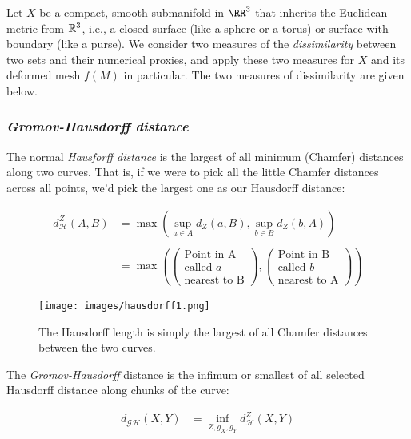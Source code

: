 Let $X$ be a compact, smooth submanifold in $\RR^3$ 
that inherits the Euclidean metric from $\mathbb{R}^3$, i.e., a closed
surface (like a sphere or a torus) or surface with boundary (like 
a purse). We consider two measures of the \emph{dissimilarity} between 
two sets and their numerical proxies, and apply these two 
measures for $X$ and its deformed mesh $f(M)$ in particular. The 
two measures of dissimilarity are given below.

\subsubsection{\emph{Gromov-Hausdorff distance}}

The normal \emph{Hausforff distance} is the largest of
all minimum (Chamfer) distances along two curves.
That is, if we were to pick all the little Chamfer
distances across all points, we'd pick the largest one
as our Hausdorff distance:

\begin{align*}
    d_{\mathcal{H}}^Z(A, B)&=\max \left(\sup _{a \in A} 
    d_Z(a, B), \sup _{b \in B} d_Z(b, A)\right) \\
    \\
    &= 
    \max \left (
\begin{pmatrix}
\text{Point in A}\\
\text{called }a \\
\text{nearest to B}
\end{pmatrix},
\begin{pmatrix}
\text{Point in B}\\
\text{called }b \\
\text{nearest to A}
\end{pmatrix}
\right )
\end{align*}

\begin{figure}[h]
    \centering
    \texttt{[image: images/hausdorff1.png]}
    \caption{The Hausdorff length is simply the largest of all
    Chamfer distances between the two curves.}
\end{figure}

The \emph{Gromov-Hausdorff} distance is the infimum
or smallest of all selected Hausdorff distance
along chunks of the curve:

\begin{align*}
    d_{\mathcal{G H}}(X, Y) &=\inf_{Z, g_X, g_Y} 
    d_{\mathcal{H}}^Z(X, Y) \\
\end{align*}

